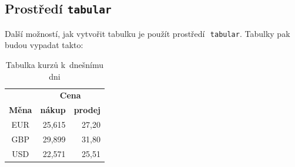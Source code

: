\documentclass[a4paper, titlepage, 11pt]{article}
\begin{document}
\subsection{Prostředí \texttt{tabular}}
Další možností, jak vytvořit tabulku je použít prostředí\,\, \verb|tabular|. Tabulky pak budou vypadat takto\footnotemark[1]:
\bigskip
\begin{table}[h]
  \centering
  \begin{tabular}[h]{|c|r|r|}
  \hline
                        & \multicolumn{2}{c|}{\textbf{Cena}} \\
                        \cline{2-3}
  \textbf{Měna}         & \textbf{nákup}       & \textbf{prodej}\\
  \hline
  EUR                   & 25,615      & 27,20\\
  GBP                   & 29,899      & 31,80\\
  USD                   & 22,571      & 25,51\\
  \hline
  \end{tabular}
\caption{Tabulka kurzů k~dnešnímu dni}
\label{tab:price}
\end{table}
\end{document}
